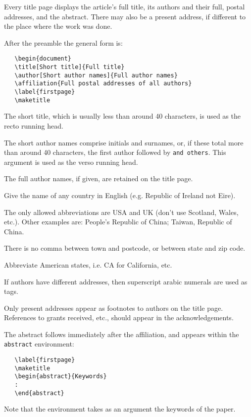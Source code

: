 \documentclass{rspublic}
\begin{document}
Every title page displays the article's full title, its authors and their full, postal
addresses, and the abstract. There may also be a present address, if different to the
place where the work was done.

After the preamble the general form is:
\begin{verbatim}
   \begin{document}
   \title[Short title]{Full title}
   \author[Short author names]{Full author names}
   \affiliation{Full postal addresses of all authors}
   \label{firstpage}
   \maketitle
\end{verbatim}

\bi
\item The short title, which is usually less than around 40
characters, is used as the recto running head.

\item The short author names comprise initials and surnames, or, if
these total more than around 40 characters, the first author followed
by \verb'and others'. This argument is used as the verso running head.

\item The full author names, if given, are retained on the title
page.

\item Give the name of any country in English (e.g. Republic of
Ireland not Eire).

\item The only allowed abbreviations are USA and UK (don't use Scotland, Wales,
etc.). Other examples are: People's Republic of China; Taiwan, Republic of China.

\item There is no comma between town and postcode, or between state
and zip code.

\item Abbreviate American states, i.e. CA for California, etc.

\item If authors have different addresses, then superscript arabic
numerals are used as tags.

\item Only present addresses appear as footnotes to authors on
the title page. References to grants received, etc., should
appear in the acknowledgements.
\ei

The abstract follows immediately after the affiliation, and appears
within the \verb'abstract' environment:
\begin{verbatim}
   \label{firstpage}
   \maketitle
   \begin{abstract}{Keywords}
   :
   \end{abstract}
\end{verbatim}
Note that the environment takes as an argument the keywords of the paper.
\end{document}

